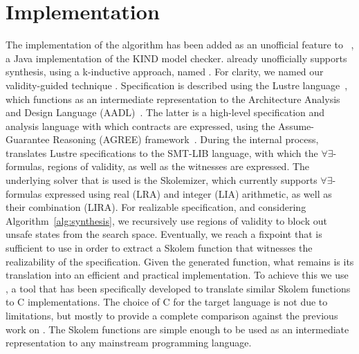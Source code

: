 \section{Implementation}
\label{sec:impl}

The implementation of the algorithm has been added as an
unofficial feature to \jkind~\cite{jkind}, a Java implementation of the
\textsc{KIND} model checker. \jkind already unofficially supports synthesis,
using a k-inductive approach, named \jsyn. For clarity, we named
our validity-guided technique \jsynvg. Specification is described using the
Lustre language~\cite{lustrev6}, which functions as an intermediate representation to the Architecture Analysis and Design Language (\textsc{AADL})~\cite{feiler2006architecture}.
The latter is a high-level specification and analysis language with which
contracts are expressed, using the Assume-Guarantee Reasoning (\textsc{AGREE})
framework~\cite{NFM2012:CoGaMiWhLaLu}.
During the internal process, \jsynvg translates Lustre specifications to
the SMT-LIB language, with which the $\forall\exists$-formulas, regions of
validity, as well as the witnesses are expressed. The underlying solver that is
used is the \aeval Skolemizer, which currently supports $\forall\exists$-formulas expressed using real (LRA) and integer (LIA) arithmetic, as well as
their combination (LIRA).
%
For realizable specification, and considering Algorithm~\ref{alg:synthesis}, we
recursively use regions of validity to block out unsafe states from the search
space.
Eventually, we reach a fixpoint that is sufficient to use in order to extract
a Skolem function that witnesses the realizability of the specification. Given
the generated function, what remains is its translation
into an efficient and practical implementation. To achieve this we use
\smtlibtoc, a tool that has been specifically developed to translate
similar \aeval Skolem functions to C implementations. The choice of C for
the target language is not due to limitations, but mostly to provide a complete
comparison against the previous work on \jsyn.
The Skolem functions are simple enough to be used as an intermediate
representation to any mainstream programming language.




